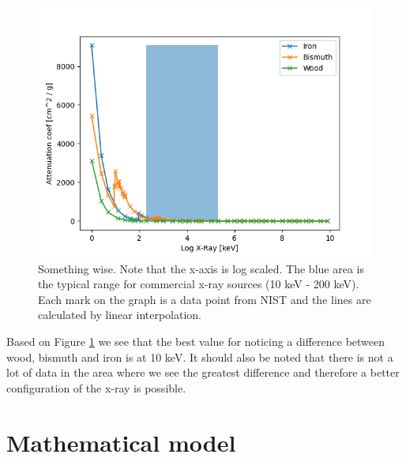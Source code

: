\documentclass{article}
\begin{document}
\begin{figure}[H]
    \centering
    \includegraphics[scale=0.5]{images/attenuation_coef.png}
    \caption{\small Something wise. Note that the x-axis is log scaled. The blue area is the typical range for commercial x-ray sources (10 keV - 200 keV). Each mark on the graph is a data point from NIST and the lines are calculated by linear interpolation.}
    \label{fig:attenuation_coef}
\end{figure}

Based on Figure \ref{fig:attenuation_coef} we see that the best value for noticing a difference between wood, bismuth and iron is at 10 keV. It should also be noted that there is not a lot of data in the area where we see the greatest difference and therefore a better configuration of the x-ray is possible. 

\section{Mathematical model}
\end{document}
